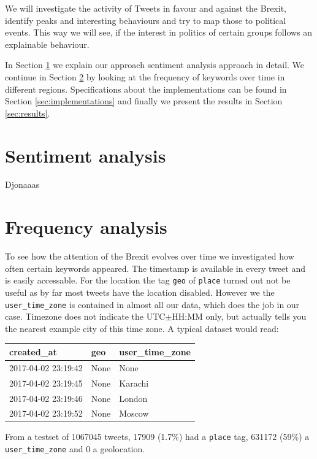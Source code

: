 \documentclass[a4paper, 8pt, twocolumn]{article}
\newcommand{\sref}[1]{Section \ref{#1}}
\begin{document}
We will investigate the activity of Tweets in favour and against the Brexit, identify peaks and interesting behaviours and try to map those to political events. 
This way we will see, if the interest in politics of certain groups follows an explainable behaviour.

In \sref{sec:sentiment-analysis} we explain our approach sentiment analysis approach in detail. 
We continue in \sref{sec:frequency-analysis} by looking at the frequency of keywords over time in different regions.
Specifications about the implementations can be found in \sref{sec:implementations} and finally we present the
results in \sref{sec:results}.


\section{Sentiment analysis}\label{sec:sentiment-analysis}
%
%
Djonaaas

\section{Frequency analysis}\label{sec:frequency-analysis}
%
%
To see how the attention of the Brexit evolves over time we investigated how often certain keywords appeared.
The timestamp is available in every tweet and is easily accessable.
For the location the tag \texttt{geo} of \texttt{place} turned out not be useful as by far most tweets have the location disabled.
However we the \texttt{user\_time\_zone} is contained in almost all our data, which does the job in our case. 
Timezone does not indicate the UTC$\pm$HH:MM only, but actually tells you the nearest example city of this time zone.
A typical dataset would read:
\newline\newline
{\ttfamily
  \begin{tabular}{|l|l|l|}
    \hline
    created\_at & geo & user\_time\_zone \\ \hline
    2017-04-02 23:19:42 & None & None \\ \hline
    2017-04-02 23:19:45 & None & Karachi \\ \hline
    2017-04-02 23:19:46 & None & London \\ \hline
    2017-04-02 23:19:52 & None & Moscow \\ \hline
  \end{tabular}
}
\newline\newline
From a testset of 1067045 tweets, 17909 (1.7\%) had a \texttt{place} tag, 631172 (59\%) a \texttt{user\_time\_zone} and 0 a geolocation.
\end{document}
